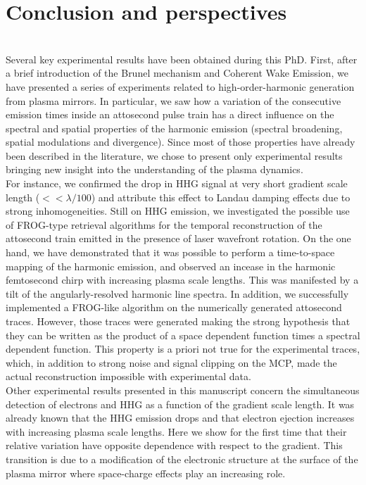 \chapter{Conclusion and perspectives}
\thispagestyle{empty}

\noindent {}\\

Several key experimental results have been obtained during this PhD. First, after a brief introduction of the Brunel mechanism and Coherent Wake Emission, we have presented a series of experiments related to high-order-harmonic generation from plasma mirrors. In particular, we saw how a variation of the consecutive emission times inside an attosecond pulse train has a direct influence on the spectral and spatial properties of the harmonic emission (spectral broadening, spatial modulations and divergence). Since most of those properties have already been described in the literature, we chose to present only experimental results bringing new insight into the understanding of the plasma dynamics. \\
\indent For instance, we confirmed the drop in HHG signal at very short gradient scale length ($<<\lambda /100$) and attribute this effect to Landau damping effects due to strong inhomogeneities. Still on HHG emission, we investigated the possible use of FROG-type retrieval algorithms for the temporal reconstruction of the attosecond train emitted in the presence of laser wavefront rotation. On the one hand, we have demonstrated that it was possible to perform a time-to-space mapping of the harmonic emission, and observed an incease in the harmonic femtosecond chirp with increasing plasma scale lengths. This was manifested by a tilt of the angularly-resolved harmonic line spectra. In addition, we successfully  implemented a FROG-like algorithm on the numerically generated attosecond traces. However, those traces were generated making the strong hypothesis that they can be written as the product of a space dependent function times a spectral dependent function. This property is a priori not true for the experimental traces, which, in addition to strong noise and signal clipping on the MCP,  made the actual reconstruction impossible with experimental data.\\
\indent Other experimental results presented in this manuscript concern the simultaneous detection of electrons and HHG as a function of the gradient scale length. It was already known that the HHG emission drops and that electron ejection increases with increasing plasma scale lengths. Here we show for the first time that their relative variation have opposite dependence with respect to the gradient. This transition is due to a modification of the electronic structure at the surface of the plasma mirror where space-charge effects play an increasing role. \\
